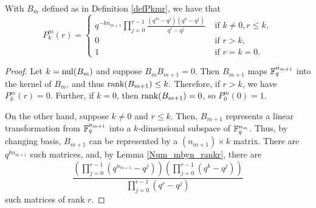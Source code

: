 \begin{lemma}\label{lemPkmr} With $B_m$ defined as in Definition \ref{defPkmr}, we have that
  \begin{equation}
    P^m_k(r) = 
    \begin{cases}
      {\displaystyle 
      q^{-kn_{m+1}}\prod_{j=0}^{r-1} \frac{(q^m-q^j) (q^n - q^j)}{q^r - q^j} }
      & \textrm{ if } k\neq 0, r \leq k, \\
           0	& \textrm{ if }  r>k,\\
           1	& \textrm{ if } r = k = 0.
	 \end{cases}
	 \label{eqn:Pmkr}
       \end{equation}
\end{lemma}
\begin{proof}
Let $k= \mathrm{nul}(B_{m})$ and suppose $B_mB_{m+1} = 0$.  Then $B_{m+1}$ maps $\mathbb{F}_q^{n_{m+1}}$ into the kernel of $B_m$, and thus $\operatorname{\mathrm{rank}}(B_{m+1}) \leq k$.  Therefore, if $r>k$, we have $P^m_k(r) = 0$.  Further, if $k=0$, then $\operatorname{\mathrm{rank}}(B_{m+1}) = 0$, so $P^m_0(0) = 1$.

On the other hand, suppose $k\neq 0$ and $r\leq k$.  Then, $B_{m+1}$ represents a linear transformation from $\mathbb{F}_q^{n_{m+1}}$ into a $k$-dimensional subspace of $\mathbb{F}_q^{n_{m}}$. Thus, by changing basis, $B_{m+1}$ can be represented by a $(n_{m+1}) \times k$ matrix.  There are $q^{kn_{m+1}}$ such matrices, and, by Lemma \ref{Num_mbyn_rankr}, there are 
\[
 \displaystyle \frac{\left(\prod_{j=0}^{r-1}\left(q^{n_{m+1}}-q^{j}\right)\right)
  \left(\prod_{j=0}^{r-1}\left(q^k - q^j \right) \right)}
  {\prod_{j=0}^{r-1} \left(q^r-q^j\right)}
\]
such matrices of rank $r$.
\end{proof}
